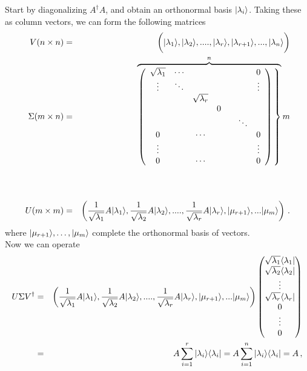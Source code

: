 \documentclass[11pt]{article}
\begin{document}
    Start by diagonalizing \(A^\dagger A\), and obtain an orthonormal basis
\(|\lambda_i\rangle\). Taking these as column vectors, we can form the
following matrices\\
\begin{eqnarray}
V(n\times n) &=& \left(\rule{0mm}{5mm} \ket{\lambda_1},\ket{\lambda_2},....,\ket{\lambda_r},\ket{\lambda_{r+1}},...,\ket{\lambda_n}\right)
\nonumber \\ \rule{0mm}{18mm} 
\Sigma(m\times n) &=&  \rule{0mm}{10mm} 
\overbrace{
\left.\left(
\begin{array}{ccccccc} 
\sqrt{\lambda_1} &\cdots  &    &  & & &  0  \\  \vdots & \ddots & & & & & \vdots  \\  & & \sqrt{\lambda_r} & & & &  \\
   & &  & 0  & &  &    \\ & & & & & \ddots &  \\  0 & &\cdots  & & & & 0  \\ \vdots & &&&& & \vdots \\ 0 & & \cdots & & & & 0
\end{array}
\right)\, \right\}  }^{n} m
\nonumber \\ \rule{0mm}{18mm}
U(m\times m) &=& \left( \rule{0mm}{3mm} \frac{1}{\sqrt{\lambda_1}}A\ket{\lambda_1}, \frac{1}{\sqrt{\lambda_2}}A\ket{\lambda_2}, ...., 
\frac{1}{\sqrt{\lambda_r}}A\ket{\lambda_r}, \ket{\mu_{r+1}},...\ket{\mu_m} \right) \, .
\nonumber 
\end{eqnarray} where \(|\mu_{r+1}\rangle,\dots,|\mu_m\rangle\) complete the
orthonormal basis of vectors.\\

    Now we can operate\\
\begin{eqnarray}
U\Sigma V^\dagger &=& \left( \rule{0mm}{3mm} \frac{1}{\sqrt{\lambda_1}}A\ket{\lambda_1}, \frac{1}{\sqrt{\lambda_2}}A\ket{\lambda_2}, ...., 
\frac{1}{\sqrt{\lambda_r}}A\ket{\lambda_r}, \ket{\mu_{r+1}},...\ket{\mu_m} \right)
\begin{pmatrix} \sqrt{\lambda_1}\bra{\lambda_1} \\ \sqrt{\lambda_2}\bra{\lambda_2}  \\ \vdots \\ \sqrt{\lambda_r}\bra{\lambda_r} \\ 0 \\ \vdots \\ 0 \end{pmatrix} \nonumber\\
&=& A \sum_{i=1}^r \ket{\lambda_i}\bra{\lambda_i} = A \sum_{i=1}^n \ket{\lambda_i}\bra{\lambda_i} = A\, , \nonumber
\end{eqnarray}
\end{document}
